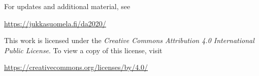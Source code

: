 
For updates and additional material, see
\begin{center}
    \url{https://jukkasuomela.fi/da2020/}
\end{center}



\begin{samepage}
This work is licensed under the \emph{Creative Commons Attribution 4.0 International Public License}. To view a copy of this license, visit
\begin{center}
    \url{https://creativecommons.org/licenses/by/4.0/}
\end{center}
\end{samepage}
